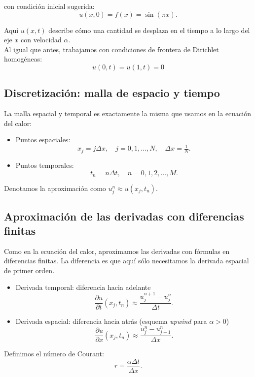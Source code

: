 \documentclass[12pt,a4paper]{article}
\begin{document}
con condición inicial sugerida:
\[
u(x,0) = f(x) = \sin(\pi x).
\]

Aquí $u(x,t)$ describe cómo una cantidad se desplaza en el tiempo a lo largo del eje $x$ con velocidad $\alpha$. \\

Al igual que antes, trabajamos con condiciones de frontera de Dirichlet homogéneas:
\[
u(0,t)=u(1,t)=0
\]

\subsection{Discretización: malla de espacio y tiempo}

La malla espacial y temporal es exactamente la misma que usamos en la ecuación del calor:

\begin{itemize}
    \item Puntos espaciales:
    \[
    x_j = j \Delta x, \quad j = 0,1,\dots,N, \quad \Delta x = \tfrac{1}{N}.
    \]

    \item Puntos temporales:
    \[
    t_n = n\Delta t, \quad n = 0,1,2,\dots,M.
    \]
\end{itemize}

Denotamos la aproximación como $u_j^n \approx u(x_j,t_n)$.

\subsection{Aproximación de las derivadas con diferencias finitas}

Como en la ecuación del calor, aproximamos las derivadas con fórmulas en diferencias finitas.  
La diferencia es que aquí sólo necesitamos la derivada espacial de primer orden.

\begin{itemize}
    \item Derivada temporal: diferencia hacia adelante
    \[
    \frac{\partial u}{\partial t}(x_j,t_n) \approx \frac{u_j^{n+1}-u_j^n}{\Delta t}.
    \]

    \item Derivada espacial: diferencia hacia atrás (esquema \emph{upwind} para $\alpha>0$)
    \[
    \frac{\partial u}{\partial x}(x_j,t_n) \approx \frac{u_j^n - u_{j-1}^n}{\Delta x}.
    \]
\end{itemize}

Definimos el número de Courant:
\[
r = \frac{\alpha \Delta t}{\Delta x}.
\]
\end{document}
